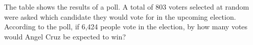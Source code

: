 \vspace{1em}

The table shows the results of a poll. A total of 803 voters selected at random were asked which candidate they would vote for in the upcoming election.  
According to the poll, if 6,424 people vote in the election, by how many votes would Angel Cruz be expected to win?

\vspace{0.75em}


\vspace{2em}

\newpage

























\newpage
